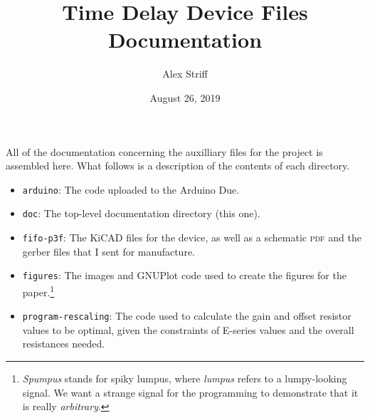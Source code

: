 \documentclass[11pt,letterpaper]{article}
\title{Time Delay Device Files Documentation}
\author{Alex Striff}
\date{August 26, 2019}
\begin{document}
\maketitle

All of the documentation concerning the auxilliary files for the project is
assembled here. What follows is a description of the contents of each directory.

\begin{itemize}
  \item \texttt{arduino}: The code uploaded to the Arduino Due.
  \item \texttt{doc}: The top-level documentation directory (this one).
  \item \texttt{fifo-p3f}: The KiCAD files for the device, as well as a
    schematic \textsc{pdf} and the gerber files that I sent for manufacture.
  \item \texttt{figures}: The images and GNUPlot code used to create the figures
    for the paper.\footnote{\emph{Spumpus} stands for spiky lumpus, where
      \emph{lumpus} refers to a lumpy-looking signal. We want a strange signal
    for the programming to demonstrate that it is really \emph{arbitrary}.}
  \item \texttt{program-rescaling}: The code used to calculate the gain and
    offset resistor values to be optimal, given the constraints of E-series
    values and the overall resistances needed.
\end{itemize}
\end{document}
